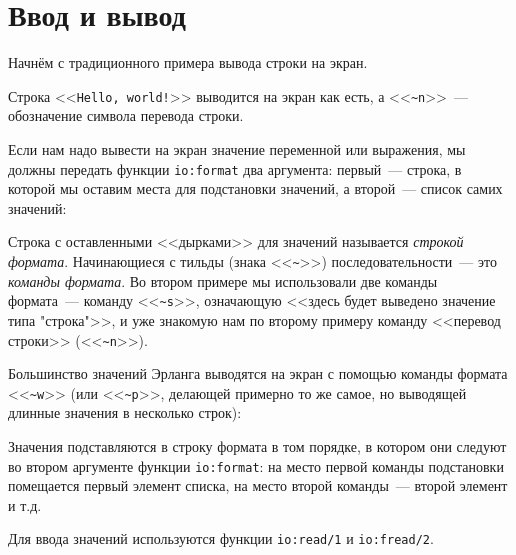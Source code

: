 \documentclass[
  paper=a4,
  fontsize=14pt,
  openany,
  appendixprefix=true
]{scrbook}
\begin{document}
\section{Ввод и вывод}

Начнём с традиционного примера вывода строки на экран.

\label{simpleformat}

Строка <<\lstinline{Hello, world!}>> выводится на экран как есть, а <<\lstinline{~n}>>~--- обозначение символа перевода строки.

Если нам надо вывести на экран значение переменной или выражения, мы должны передать функции \lstinline{io:format} два аргумента: первый~--- строка, в которой мы оставим места для подстановки значений, а второй~--- список самих значений:


Строка с оставленными <<дырками>> для значений называется {\em строкой формата}. Начинающиеся с тильды (знака <<\lstinline{~}>>) последовательности~--- это {\em команды формата}. Во втором примере мы использовали две команды формата~--- команду <<\lstinline{~s}>>, означающую <<здесь будет выведено значение типа "строка"{}>>, и уже знакомую нам по второму примеру команду <<перевод строки>> (<<\lstinline{~n}>>).

Большинство значений Эрланга выводятся на экран с помощью команды формата <<\lstinline{~w}>> (или <<\lstinline{~p}>>, делающей примерно то же самое, но выводящей длинные значения в несколько строк):


Значения подставляются в строку формата в том порядке, в котором они следуют во втором аргументе функции \lstinline{io:format}: на место первой команды подстановки помещается первый элемент списка, на место второй команды~--- второй элемент и т.д.

Для ввода значений используются функции \lstinline{io:read/1} и \lstinline{io:fread/2}.
\end{document}
